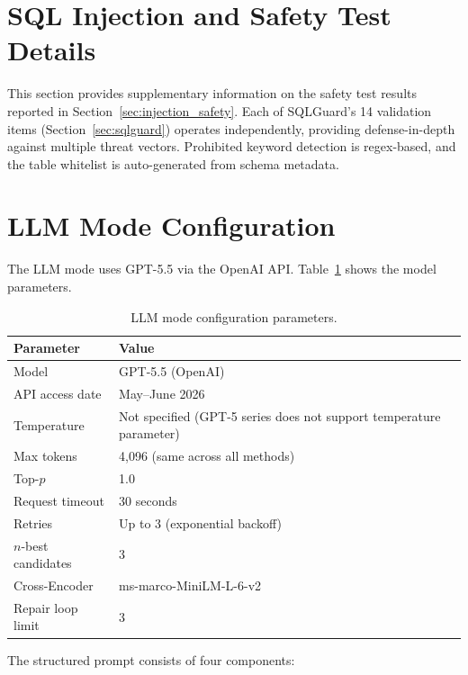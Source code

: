 \documentclass{npj-compt.mater}
\begin{document}
\section{SQL Injection and Safety Test Details}
\label{sec:sup_injection}

This section provides supplementary information on the safety test
results reported in Section~\ref{sec:injection_safety}.
Each of SQLGuard's 14 validation items
(Section~\ref{sec:sqlguard}) operates independently, providing
defense-in-depth against multiple threat vectors.
Prohibited keyword detection is regex-based, and the table
whitelist is auto-generated from schema metadata.

\section{LLM Mode Configuration}
\label{sec:sup_llm_config}

The LLM mode uses GPT-5.5 via the OpenAI API.
Table~\ref{tab:sup_llm_params} shows the model parameters.

\begin{table}[htbp]
  \centering
  \caption{LLM mode configuration parameters.}
  \label{tab:sup_llm_params}
  \small
  \begin{tabular}{ll}
    \toprule
    Parameter & Value \\
    \midrule
    Model & GPT-5.5 (OpenAI) \\
    API access date & May--June 2026 \\
    Temperature & Not specified (GPT-5 series does not support temperature parameter) \\
    Max tokens & 4{,}096 (same across all methods) \\
    Top-$p$ & 1.0 \\
    Request timeout & 30 seconds \\
    Retries & Up to 3 (exponential backoff) \\
    $n$-best candidates & 3 \\
    Cross-Encoder & ms-marco-MiniLM-L-6-v2 \\
    Repair loop limit & 3 \\
    \bottomrule
  \end{tabular}
\end{table}

The structured prompt consists of four components:
\end{document}
